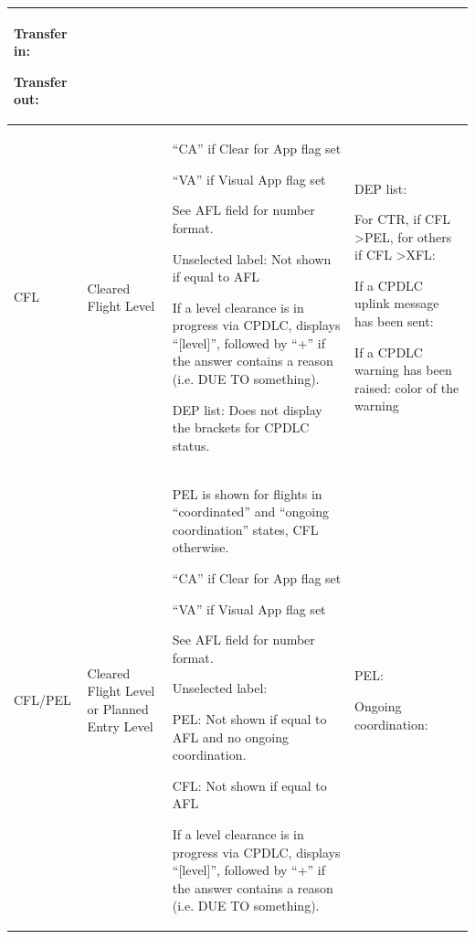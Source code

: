 \documentclass[11pt,a4paper]{memoir}
\newcounter{rowcounter}
\newcommand{\nextrow}{\refstepcounter{rowcounter}}
\newcommand{\colorref}[1]{\textit{\hyperref[#1]{\StrDel{#1}{color:}}}}
\begin{document}
\begin{longtable}{|p{2.5cm}|p{2.5cm}|p{4.5cm}|p{4.5cm}|}
      Transfer in: \colorref{color:Assumed} 
      
      Transfer out: \colorref{color:Redundant} \\ \hline
    CFL \nextrow \label{tag:CFL}&
      Cleared Flight Level &
      “CA” if Clear for App flag set
      
      “VA” if Visual App flag set
      \bigskip

      See AFL field for number format. 
      \bigskip
      
      Unselected label: Not shown if equal to AFL 
      \bigskip

      If a level clearance is in progress via  CPDLC, displays “{[}level{]}”, followed  by “+” if the answer contains a  reason (i.e. DUE TO something). 
      \bigskip

      DEP list:
      Does not display the  brackets for CPDLC status. &
      DEP list: 
      
      For CTR, if CFL \textgreater PEL,  for others if CFL \textgreater XFL: 
      
      \colorref{color:Warning} 
      \bigskip
      
      If a CPDLC uplink message  has been sent:  \colorref{color:CPDLC UM Clearance} 
      
      If a CPDLC warning has  been raised: color of the  warning \\ \hline
    CFL/PEL \nextrow \label{tag:CFL/PEL}&
      Cleared Flight Level or  Planned Entry Level &
      PEL is shown for flights in  “coordinated” and “ongoing coordination” states, CFL otherwise. 
      \bigskip 
      
      “CA” if Clear for App flag set
      
      “VA” if Visual App flag set
      
      See AFL field for number format.
      \bigskip 
      
      Unselected label: 
      
      PEL: Not shown if equal to AFL and no ongoing coordination. 
      
      CFL: Not shown if equal to AFL 
      \bigskip
      
      If a level clearance is in progress via  CPDLC, displays “{[}level{]}”, followed  by “+” if the answer contains a  reason (i.e. DUE TO something). &
      PEL: 
      
      Ongoing coordination:  
      
      \colorref{color:Proposition In} 
      

\end{longtable}
\end{document}
